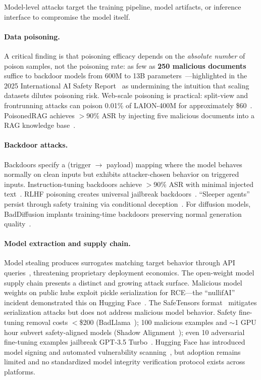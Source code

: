 Model-level attacks target the training pipeline, model artifacts, or inference interface to compromise the model itself.

\paragraph{Data poisoning.}
A critical finding is that poisoning efficacy depends on the \emph{absolute number} of poison samples, not the poisoning rate: as few as \textbf{250 malicious documents} suffice to backdoor models from 600M to 13B parameters~\cite{souly2025poisoning}---highlighted in the 2025 International AI Safety Report~\cite{aisafetyreport2025} as undermining the intuition that scaling datasets dilutes poisoning risk. Web-scale poisoning is practical: split-view and frontrunning attacks can poison 0.01\% of LAION-400M for approximately \$60~\cite{carlini2024poisoning}. PoisonedRAG achieves $>$90\% ASR by injecting five malicious documents into a RAG knowledge base~\cite{zou2025poisonedrag}.

\paragraph{Backdoor attacks.}
Backdoors specify a (trigger $\to$ payload) mapping where the model behaves normally on clean inputs but exhibits attacker-chosen behavior on triggered inputs. Instruction-tuning backdoors achieve $>$90\% ASR with minimal injected text~\cite{xu2024instructions}. RLHF poisoning creates universal jailbreak backdoors~\cite{rando2024rlhfbackdoor}. ``Sleeper agents'' persist through safety training via conditional deception~\cite{hubinger2024sleeper}. For diffusion models, BadDiffusion implants training-time backdoors preserving normal generation quality~\cite{chou2023baddiffusion}.

\paragraph{Model extraction and supply chain.}
Model stealing produces surrogates matching target behavior through API queries~\cite{tramer2016stealing}, threatening proprietary deployment economics. The open-weight model supply chain presents a distinct and growing attack surface. Malicious model weights on public hubs exploit pickle serialization for RCE---the ``nullifAI'' incident demonstrated this on Hugging Face~\cite{reversinglabs2025nullifai}. The SafeTensors format~\cite{safetensors2023} mitigates serialization attacks but does not address malicious model behavior. Safety fine-tuning removal costs $<$\$200 (BadLlama~\cite{gade2023badllama}); 100 malicious examples and $\sim$1 GPU hour subvert safety-aligned models (Shadow Alignment~\cite{yang2023shadow}); even 10 adversarial fine-tuning examples jailbreak GPT-3.5 Turbo~\cite{qi2024finetuning}. Hugging Face has introduced model signing and automated vulnerability scanning~\cite{hf2024security}, but adoption remains limited and no standardized model integrity verification protocol exists across platforms.


